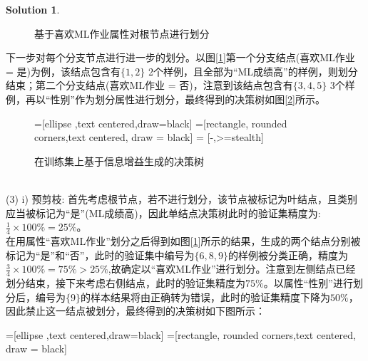 \documentclass[a4paper,UTF8]{article}
\theoremstyle{definition}
\newtheorem*{solution}{Solution}
\begin{document}
\begin{solution}
\begin{figure}[htbp]
\begin{tikzpicture}[node distance=1cm]
\end{tikzpicture}
\caption{基于喜欢ML作业属性对根节点进行划分}
\label{decision tree 1}
\end{figure}
下一步对每个分支节点进行进一步的划分。以图[\ref{decision tree 1}]第一个分支结点(喜欢ML作业 = 是)为例，该结点包含有$\{1,2\}$ 2个样例，且全部为“ML成绩高”的样例，则划分结束；第二个分支结点(喜欢ML作业 = 否)，注意到该结点包含有$\{3,4,5\}$ 3个样例，再以“性别”作为划分属性进行划分，最终得到的决策树如图[\ref{decision tree 2}]所示。
\begin{figure}[htbp]
\centering
{}=[ellipse ,text centered,draw=black]
 =[rectangle, rounded corners,text centered, draw = black]
 = [-,>=stealth]
\caption{在训练集上基于信息增益生成的决策树}
\label{decision tree 2}
\end{figure}
\\(3) i) 预剪枝: 首先考虑根节点，若不进行划分，该节点被标记为叶结点，且类别应当被标记为“是”(ML成绩高)，因此单结点决策树此时的验证集精度为: $\frac{1}{4}\times 100\% = 25\%$。\\在用属性“喜欢ML作业”划分之后得到如图[\ref{decision tree 1}]所示的结果，生成的两个结点分别被标记为“是”和“否”，此时的验证集中编号为$\{6,8,9\}$的样例被分类正确，精度为$\frac{3}{4}\times 100\% = 75\% > 25\%$,故确定以“喜欢ML作业”进行划分。注意到左侧结点已经划分结束，接下来考虑右侧结点，此时的验证集精度为$75\%$。以属性“性别”进行划分后，编号为$\{9\}$的样本结果将由正确转为错误，此时的验证集精度下降为$50\%$，因此禁止这一结点被划分，最终得到的决策树如下图所示：
\begin{center}
=[ellipse ,text centered,draw=black]
 =[rectangle, rounded corners,text centered, draw = black]

\end{center}
\end{solution}
\end{document}
